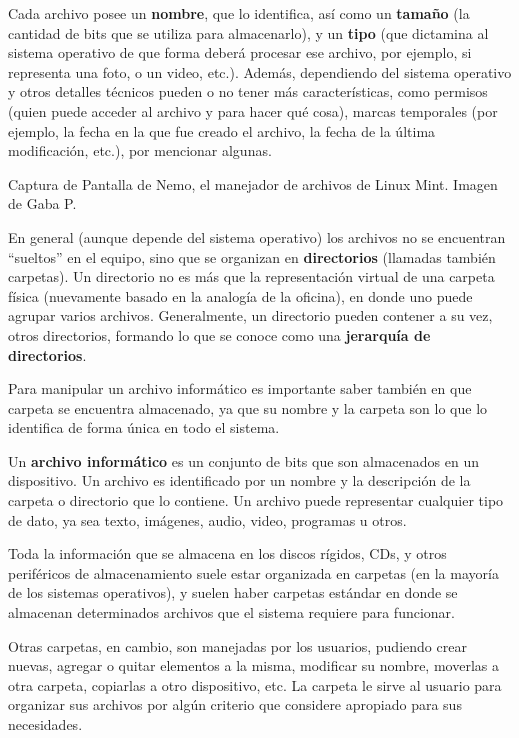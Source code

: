 Cada archivo posee un \textbf{nombre}, que lo identifica, así como un
\textbf{tamaño} (la cantidad de bits que se utiliza para almacenarlo), y un
\textbf{tipo} (que dictamina al sistema operativo de que forma deberá procesar
ese archivo, por ejemplo, si representa una foto, o un video, etc.). Además,
dependiendo del sistema operativo y otros detalles técnicos pueden o no tener
más características, como permisos (quien puede acceder al archivo y para hacer
qué cosa), marcas temporales (por ejemplo, la fecha en la que fue creado el
archivo, la fecha de la última modificación, etc.), por mencionar algunas.

{Captura de Pantalla de Nemo, el manejador de archivos de Linux Mint.} {Imagen
de Gaba P.}

En general (aunque depende del sistema operativo) los archivos no se encuentran
``sueltos'' en el equipo, sino que se organizan en \textbf{directorios}
(llamadas también carpetas). Un directorio no es más que la representación
virtual de una carpeta física (nuevamente basado en la analogía de la oficina),
en donde uno puede agrupar varios archivos. Generalmente, un directorio pueden
contener a su vez, otros directorios, formando lo que se conoce como una
\textbf{jerarquía de directorios}.

Para manipular un archivo informático es importante saber también en que carpeta
se encuentra almacenado, ya que su nombre y la carpeta son lo que lo identifica
de forma única en todo el sistema.

\begin{definition} Un \textbf{archivo informático} es un conjunto
    de bits que son almacenados en un dispositivo. Un archivo es identificado
    por un nombre y la descripción de la carpeta o directorio que lo contiene.
    Un archivo puede representar cualquier tipo de dato, ya sea texto, imágenes,
    audio, video, programas u otros.
    \autocite[part. IV]{gookin_2005}
\end{definition}

Toda la información que se almacena en los discos rígidos, CDs, y otros
periféricos de almacenamiento suele estar organizada en carpetas (en la mayoría
de los sistemas operativos), y suelen haber carpetas estándar en donde se
almacenan determinados archivos que el sistema requiere para funcionar.

Otras carpetas, en cambio, son manejadas por los usuarios, pudiendo crear
nuevas, agregar o quitar elementos a la misma, modificar su nombre, moverlas a
otra carpeta, copiarlas a otro dispositivo, etc. La carpeta le sirve al usuario
para organizar sus archivos por algún criterio que considere apropiado para sus
necesidades.

